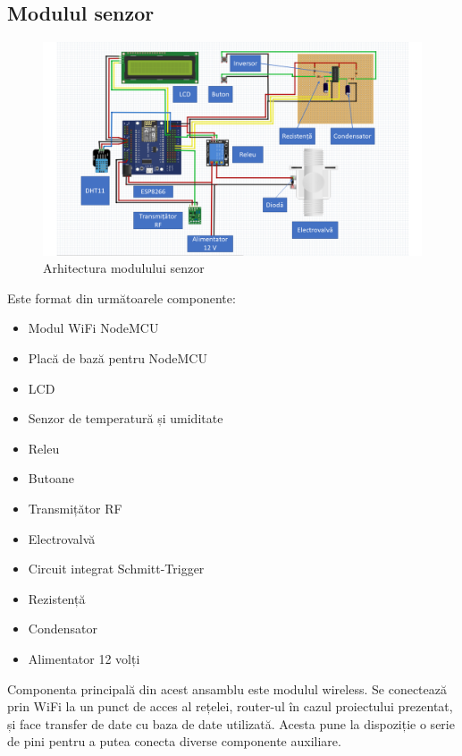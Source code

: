 \subsection{Modulul senzor}

\begin{figure}[H]
   	\centering
    	\includegraphics[width=1\textwidth]{ModulSenzor.png}
	\caption{Arhitectura modulului senzor}
\end{figure}	

	Este format din următoarele componente:
	\begin{itemize}
		\setlength{\itemindent}{2em}
			\itemsep0em
			\item Modul WiFi NodeMCU
			\item Placă de bază pentru NodeMCU
			\item LCD
			\item Senzor de temperatură și umiditate
			\item Releu
			\item Butoane
			\item Transmițător RF
			\item Electrovalvă
			\item Circuit integrat Schmitt-Trigger
			\item Rezistență
			\item Condensator
			\item Alimentator 12 volți
	\end{itemize}

	Componenta principală din acest ansamblu este modulul wireless. Se conectează prin WiFi la un punct de acces al rețelei, router-ul în cazul proiectului prezentat, și face transfer de date cu baza de date utilizată. Acesta pune la dispoziție o serie de pini pentru a putea conecta diverse componente auxiliare. 
	
